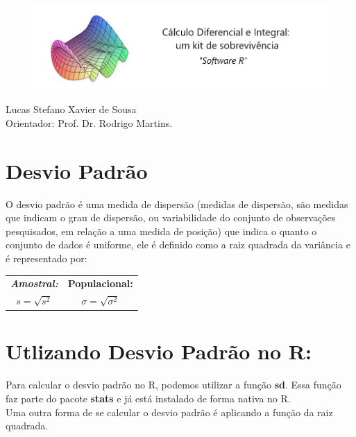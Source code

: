 \documentclass[12pt,a4paper]{article}
\begin{document}
	
\begin{figure}[htb]
\includegraphics[scale=0.6]{logo.jpg}
\end{figure}

	
	
	\begin{center}Lucas Stefano Xavier de Sousa \\ Orientador: Prof. Dr. Rodrigo Martins.\end{center}
	
	
	\vspace{2cm}
	
	\section*{Desvio Padrão}
	
	O desvio padrão é uma medida de dispersão (medidas de dispersão, são medidas  que indicam o grau de dispersão, ou variabilidade do conjunto de  observações pesquisados, em relação a uma medida de posição) que indica o quanto o conjunto de dados é uniforme, ele é definido como a raiz quadrada da variância e é representado por:\\
	
	\begin{center}									
		\vspace{0.2cm}
		\begin{tabular}{|c||c|}
			\hline
			\textit{\textbf{Amostral:}} & \textbf{Populacional:} \\
			$s= \sqrt{s^2}$             &  $	\sigma= \sqrt{\sigma^2}$ \\
			\hline
		\end{tabular}
	\end{center}

	
	
	\section*{Utlizando Desvio Padrão no R:}
	
	Para calcular o desvio padrão no R, podemos utilizar a função \textbf{sd}. Essa função faz parte do pacote \textbf{stats} e já está instalado de forma nativa no R.\\
	Uma outra forma de se calcular o desvio padrão é aplicando a função da raiz quadrada. \\
\end{document}
